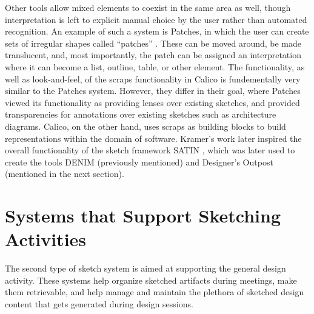 Other tools allow mixed elements to coexist in the same area as well, though interpretation is left to explicit manual choice by the user rather than automated recognition. An example of such a system is Patches, in which the user can create sets of irregular shapes called ``patches'' \citep{Kramer}. These can be moved around, be made translucent, and, most importantly, the patch can be assigned an interpretation where it can become a list, outline, table, or other element. The functionality, as well as look-and-feel, of the scraps functionality in Calico is fundementally very similar to the Patches system. However, they differ in their goal, where Patches viewed its functionality as providing lenses over existing sketches, and provided transparencies for annotations over existing sketches such as architecture diagrams. Calico, on the other hand, uses scraps as building blocks to build representations within the domain of software. Kramer's work later inspired the overall functionality of the sketch framework SATIN \citep{Hong}, which was later used to create the tools DENIM (previously mentioned) and Designer's Outpost (mentioned in the next section). 

\section{Systems that Support Sketching Activities}
\label{relatedwork:2}

The second type of sketch system is aimed at supporting the general design activity. These systems help organize sketched artifacts during meetings, make them retrievable, and help manage and maintain the plethora of sketched design content that gets generated during design sessions. 

